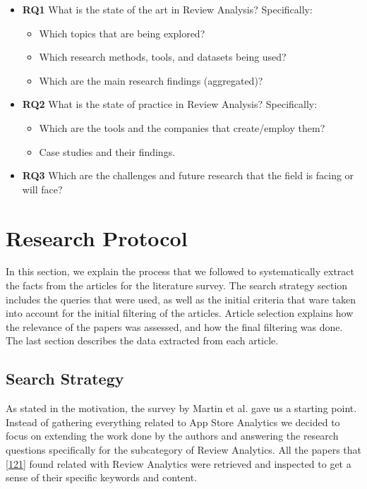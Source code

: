 \documentclass[]{book}
\providecommand{\tightlist}{%
  \setlength{\itemsep}{0pt}\setlength{\parskip}{0pt}}
\begin{document}
\begin{itemize}
\tightlist
\item
  \textbf{RQ1} What is the state of the art in Review Analysis?
  Specifically:

  \begin{itemize}
  \tightlist
  \item
    Which topics that are being explored?
  \item
    Which research methods, tools, and datasets being used?
  \item
    Which are the main research findings (aggregated)?
  \end{itemize}
\item
  \textbf{RQ2} What is the state of practice in Review Analysis?
  Specifically:

  \begin{itemize}
  \tightlist
  \item
    Which are the tools and the companies that create/employ them?
  \item
    Case studies and their findings.
  \end{itemize}
\item
  \textbf{RQ3} Which are the challenges and future research that the
  field is facing or will face?
\end{itemize}

\section{Research Protocol}\label{research-protocol-6}

In this section, we explain the process that we followed to
systematically extract the facts from the articles for the literature
survey. The search strategy section includes the queries that were used,
as well as the initial criteria that ware taken into account for the
initial filtering of the articles. Article selection explains how the
relevance of the papers was assessed, and how the final filtering was
done. The last section describes the data extracted from each article.

\subsection{Search Strategy}\label{search-strategy-2}

As stated in the motivation, the survey by Martin et al. gave us a
starting point. Instead of gathering everything related to App Store
Analytics we decided to focus on extending the work done by the authors
and answering the research questions specifically for the subcategory of
Review Analytics. All the papers that
{[}\protect\hyperlink{ref-martin2015survey}{121}{]} found related with
Review Analytics were retrieved and inspected to get a sense of their
specific keywords and content.
\end{document}
